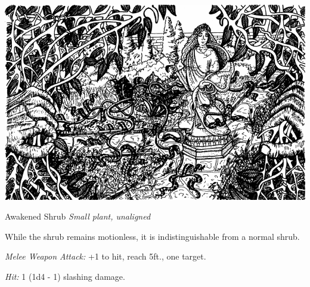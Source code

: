 \documentclass[palace_of_the_silver_princess]{subfiles}
\begin{document}
\includegraphics[width=\columnwidth]{img/garden.png}

\begin{monsterbox}{Awakened Shrub}
	\textit{Small plant, unaligned}\\
	\hline
	\basics[
		armorclass = {9},
		hitpoints = {10 (3d6)},
		speed = {20~ft.}]
	\hline
	\stats[
		STR = \stat{3},
		DEX = \stat{8},
		CON = \stat{11},
		INT = \stat{10},
		WIS = \stat{10},
		CHA = \stat{6}]
	\hline
	\details[
        damagevulnerabilities = {fire},
        damageresistances = {piercing},
		senses = {passive Perception 10},
		languages = {Common},
		challenge = {0 (10 XP)}]
	\hline
	\begin{monsteraction}
        While the shrub remains motionless, it is indistinguishable
        from a normal shrub.
	\end{monsteraction}

    \begin{monsteraction}[Rake]
		\textit{Melee Weapon Attack:} +1 to hit, reach 5ft., one target.

        \textit{Hit:} 1 (1d4 - 1) slashing damage.
	\end{monsteraction}
\end{monsterbox}
\end{document}
